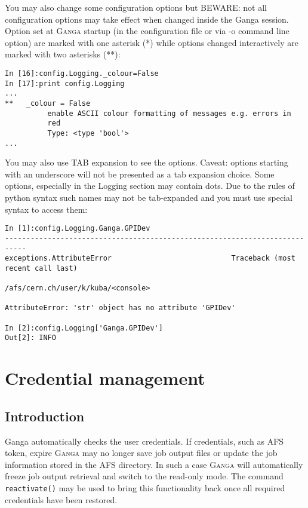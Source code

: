 \documentclass{howto}
\def\ganga {\textsc{Ganga}\xspace}
\begin{document}
You may also change some configuration options but BEWARE: not all
configuration options may take effect when changed inside the Ganga
session. Option set at \ganga startup (in the configuration file or
via -o command line option) are marked with one asterisk (*) while
options changed interactively are marked with two asterisks (**):

\begin{verbatim}
In [16]:config.Logging._colour=False
In [17]:print config.Logging
...
**   _colour = False
          enable ASCII colour formatting of messages e.g. errors in
          red
          Type: <type 'bool'>
...
\end{verbatim}

You may also use TAB expansion to see the options. Caveat: options
starting with an underscore will not be presented as a tab expansion
choice. Some options, especially in the Logging section may contain
dots. Due to the rules of python syntax such names may not be
tab-expanded and you must use special syntax to access them:

\begin{verbatim}
In [1]:config.Logging.Ganga.GPIDev
---------------------------------------------------------------------------
exceptions.AttributeError                            Traceback (most recent call last)

/afs/cern.ch/user/k/kuba/<console>

AttributeError: 'str' object has no attribute 'GPIDev'

In [2]:config.Logging['Ganga.GPIDev']
Out[2]: INFO
\end{verbatim}



\section{Credential management}

\subsection{Introduction}

Ganga automatically checks the user credentials. If credentials, such
as AFS token, expire \ganga may no longer save job output files or
update the job information stored in the AFS directory. In such a case
\ganga will automatically freeze job output retrieval and switch to
the read-only mode. The command \texttt{reactivate()} may be used to
bring this functionality back once all required credentials have been restored.
\end{document}
